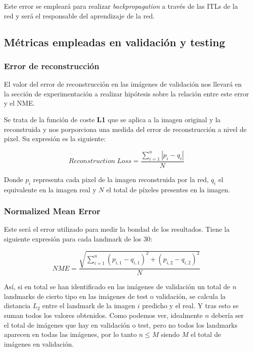             \noindent Este error se empleará para realizar \textit{backpropagation} a través de las ITLs de la red y será el responsable del aprendizaje de la red.

    \subsection{Métricas empleadas en validación y testing}

        \subsubsection{Error de reconstrucción}
            \noindent El valor del error de reconstrucción en las imágenes de validación nos llevará en la sección de experimentación a realizar hipótesis sobre la relación entre este error y el NME.

            \medskip

            \noindent Se trata de la función de coste \textbf{L1} que se aplica a la imagen original y la reconstruida  y nos porporciona una medida del error de reconstrucción a nivel de pixel. Su expresión es la siguiente:

            \begin{equation}
                Reconstruction \; Loss = \frac{\sum_{i=1}^n |p_i -q_i|}{N}
            \end{equation}

            \noindent Donde $p_i$ representa cada pixel de la imagen reconstruida por la red, $q_i$ el equivalente en la imagen real y $N$ el total de píxeles presentes en la imagen.

        \subsubsection{Normalized Mean Error}
            \noindent Este será el error utilizado para medir la bondad de los resultados. Tiene la siguiente expresión para cada landmark de los $30$: 

            \begin{equation}
                NME=\frac{\sqrt{\sum_{i=1}^{n}(p_{i,1} -q_{i,1})^2+ (p_{i,2} -q_{i,2})^2}}{N}
            \end{equation}


            \noindent Así, si en total se han identificado en las imágenes de validación un total de $n$ landmarks de cierto tipo en las imágenes de test o validación, se calcula la distancia $L_2$ entre el landmark de la imagen $i$ predicho y el real. Y tras esto se suman todos los valores obtenidos. Como podemos ver, idealmente $n$ debería ser el total de imágenes que hay en validación o test, pero no todos los landmarks aparecen en todas las imágenes, por lo tanto $n\leq M$ siendo $M$ el total de imágenes en validación.

